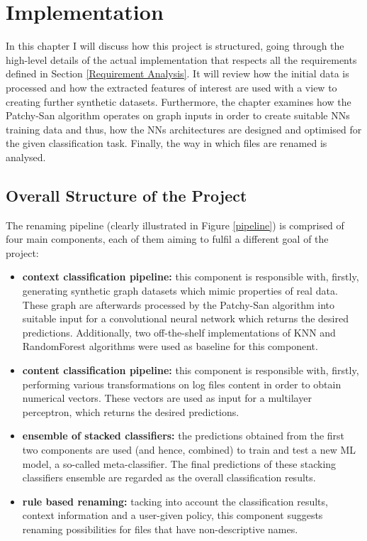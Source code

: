 

\chapter{Implementation}

In this chapter I will discuss how this project is structured, going through the high-level details of the actual implementation that respects all the requirements defined in Section \ref{Requirement Analysis}. It will review how the initial data is processed and how the extracted features of interest are used with a view to creating further synthetic datasets. Furthermore, the chapter examines how the Patchy-San algorithm operates on graph inputs in order to create suitable NNs training data and thus, how the NNs architectures are designed and optimised for the given classification task. Finally, the way in which files are renamed is analysed. \\



\section{Overall Structure of the Project}

The renaming pipeline (clearly illustrated in Figure \ref{pipeline}) is comprised of four main components, each of them aiming to fulfil a different goal of the project:

\begin{itemize}
    \item \textbf{context classification pipeline:} this component is responsible with, firstly, generating synthetic graph datasets which mimic properties of real data. These graph are afterwards processed by the Patchy-San algorithm into suitable input for a convolutional neural network  which returns the desired predictions. Additionally, two off-the-shelf implementations of KNN and RandomForest algorithms were used as baseline for this component. 

    \item \textbf{content classification pipeline:} this component is responsible with, firstly, performing various transformations on log files content in order to obtain numerical vectors. These vectors are used as input for a multilayer perceptron, which returns the desired predictions.
    
    \item \textbf{ensemble of stacked classifiers:} the predictions obtained from the first two components are used (and hence, combined) to train and test a new ML model, a so-called meta-classifier. The final predictions of these stacking classifiers ensemble are regarded as the overall classification results. 
    
    \item \textbf{rule based renaming:} tacking into account the classification results, context information and a user-given policy, this component suggests renaming possibilities for files that have non-descriptive names. 
    
\end{itemize}

